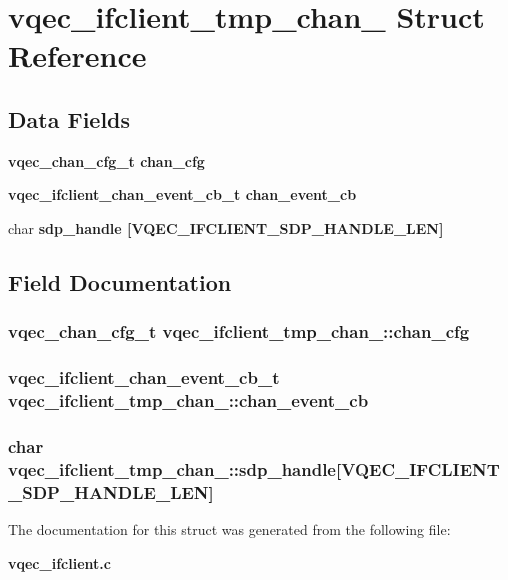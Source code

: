 \section{vqec\_\-ifclient\_\-tmp\_\-chan\_\- Struct Reference}
\label{structvqec__ifclient__tmp__chan__}
\subsection*{Data Fields}
\begin{CompactItemize}
\item 
\bf{vqec\_\-chan\_\-cfg\_\-t} \bf{chan\_\-cfg}
\item 
\bf{vqec\_\-ifclient\_\-chan\_\-event\_\-cb\_\-t} \bf{chan\_\-event\_\-cb}
\item 
char \bf{sdp\_\-handle} [VQEC\_\-IFCLIENT\_\-SDP\_\-HANDLE\_\-LEN]
\end{CompactItemize}


\subsection{Field Documentation}
\subsubsection{\setlength{\rightskip}{0pt plus 5cm}\bf{vqec\_\-chan\_\-cfg\_\-t} \bf{vqec\_\-ifclient\_\-tmp\_\-chan\_\-::chan\_\-cfg}}\label{structvqec__ifclient__tmp__chan___b99aa24de02eee92de74d588d01e0ee8}


\subsubsection{\setlength{\rightskip}{0pt plus 5cm}\bf{vqec\_\-ifclient\_\-chan\_\-event\_\-cb\_\-t} \bf{vqec\_\-ifclient\_\-tmp\_\-chan\_\-::chan\_\-event\_\-cb}}\label{structvqec__ifclient__tmp__chan___47538dcc27cbba51b1abd4419709504d}


\subsubsection{\setlength{\rightskip}{0pt plus 5cm}char \bf{vqec\_\-ifclient\_\-tmp\_\-chan\_\-::sdp\_\-handle}[VQEC\_\-IFCLIENT\_\-SDP\_\-HANDLE\_\-LEN]}\label{structvqec__ifclient__tmp__chan___2b4ccb858c6cdb43e673fac0669cb395}




The documentation for this struct was generated from the following file:\begin{CompactItemize}
\item 
\bf{vqec\_\-ifclient.c}\end{CompactItemize}
